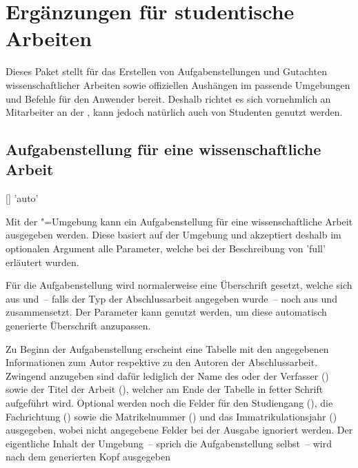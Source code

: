 \chapter[Das Paket \Package*{tudscrsupervisor} -- Studentische Betreuung]{%
  Ergänzungen für studentische Arbeiten
}
\begin{Bundle*}{}
%
Dieses Paket stellt für das Erstellen von Aufgabenstellungen und Gutachten 
wissenschaftlicher Arbeiten sowie offiziellen Aushängen im \CD passende 
Umgebungen und Befehle für den Anwender bereit. Deshalb richtet es sich 
vornehmlich an Mitarbeiter an der \TnUD, kann jedoch natürlich auch von 
Studenten genutzt werden.


\section{Aufgabenstellung für eine wissenschaftliche Arbeit}
%
%
\begin{Declaration}{[]}{%
  'auto'%
}
\begin{Declaration}{}
\begin{Declaration}[v2.05]{}
\printdeclarationlist%
%
Mit der "=Umgebung kann ein Aufgabenstellung für eine 
wissenschaftliche Arbeit ausgegeben werden. Diese basiert auf der Umgebung 
 und akzeptiert deshalb im optionalen Argument alle 
Parameter, welche bei der Beschreibung von 'full' 
erläutert wurden.

Für die Aufgabenstellung wird normalerweise eine Überschrift gesetzt, welche 
sich aus  und~-- falls der Typ der Abschlussarbeit angegeben 
wurde~-- noch aus  und  zusammensetzt. Der 
Parameter  kann genutzt werden, um diese 
automatisch generierte Überschrift anzupassen.

Zu Beginn der Aufgabenstellung erscheint eine Tabelle mit den angegebenen 
Informationen zum Autor respektive zu den Autoren der Abschlussarbeit. Zwingend 
anzugeben sind dafür lediglich der Name des oder der Verfasser () 
sowie der Titel der Arbeit (), welcher am Ende der Tabelle in 
fetter Schrift aufgeführt wird. Optional werden noch die Felder für den 
Studiengang (), die Fachrichtung () sowie die 
Matrikelnummer () und das Immatrikulationsjahr 
() ausgegeben, wobei nicht angegebene Felder bei der 
Ausgabe ignoriert werden. Der eigentliche Inhalt der Umgebung~-- sprich die 
Aufgabenstellung selbst~-- wird nach dem generierten Kopf ausgegeben


\end{Declaration}
\end{Declaration}
\end{Declaration}
\end{Bundle*}

